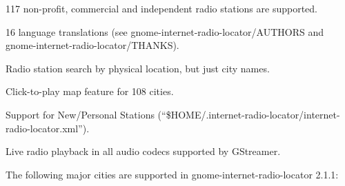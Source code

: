 \documentclass[20pt,landscape]{foils}
\begin{document}

\begin{list1}
\item 117 non-profit, commercial and independent radio stations are supported.
\item 16 language translations (see gnome-internet-radio-locator/AUTHORS and gnome-internet-radio-locator/THANKS).
\item Radio station search by physical location, but just city names.
\item Click-to-play map feature for 108 cities.
\item Support for New/Personal Stations (``\$HOME/.internet-radio-locator/internet-radio-locator.xml'').
\item Live radio playback in all audio codecs supported by GStreamer.
\end{list1}


The following major cities are supported in gnome-internet-radio-locator 2.1.1:
\end{document}

